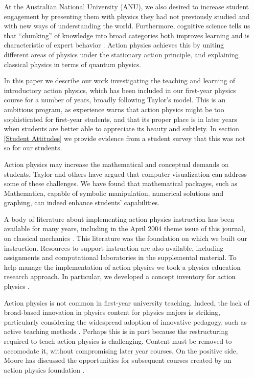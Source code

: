\documentclass[prb,oncolumn,12pt]{revtex4-2}
\begin{document}
At the Australian National University (ANU), we also desired to increase student engagement by presenting them with physics they had not previously studied and with new ways of understanding the world. Furthermore, cognitive science tells us that ``chunking'' of knowledge into broad categories both improves learning and is characteristic of expert behavior  \cite{Reif,Docktor}. Action physics achieves this by uniting different areas of physics under the stationary action principle, and explaining classical physics in terms of quantum physics.

In this paper we describe our work investigating the teaching and learning of introductory action physics, which has been included in our first-year physics course for a number of years, broadly following Taylor's model. This is an ambitious program, as experience warns that action physics might be too sophisticated for first-year students, and that its proper place is in later years when students are better able to appreciate its beauty and subtlety. In section \ref{Student Attitudes} we provide evidence from a student survey that this was not so for our students. 

Action physics may increase the mathematical and conceptual demands on students. 
Taylor \cite{TaylorCIP} and others \cite{Resources} have argued that computer visualization can address some of these challenges. We have found that mathematical packages, such as Mathematica, \cite{Mathematica} capable of symbolic manipulation, numerical solutions and graphing, can indeed enhance students' capabilities.

A body of literature about implementing action physics instruction has been available for many years, \cite{TaylorCIP, Hanc2003, Ogborn, Neuenschwander} including in the April 2004 theme issue of this journal, on classical mechanics \cite{Moore, HancAJP2004a, HancAJP2004b, HancAJP2004c}. This literature was the foundation on which we built our instruction.
Resources to support instruction are also available, \cite{Resources, QEDvideo} including assignments and computational laboratories in the supplemental material. \cite{supplement}  To help manage the implementation of action physics we took a physics education research approach. \cite{McDermott, ethics} In particular, we developed a concept inventory for action physics  \cite{McGinness}.

Action physics is not common in first-year university teaching. Indeed, the lack of broad-based innovation in physics content for physics majors is striking, particularly considering the widespread adoption of innovative pedagogy, such as active teaching methods  \cite{Active}. Perhaps this is in part because the restructuring required to teach action physics is challenging. Content must be removed to accomodate it, without compromising later year courses. On the positive side, Moore has discussed the opportunities for subsequent courses created by an action physics foundation  \cite{Moore}. 
\end{document}
